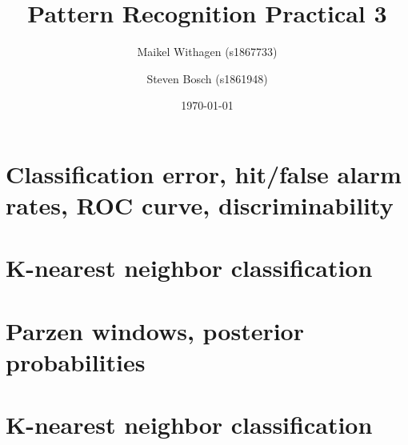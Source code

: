 \documentclass[10pt]{article}
\title{Pattern Recognition Practical 3}
\author{Maikel Withagen (s1867733) \and Steven Bosch (s1861948)}
\date{\today}
\begin{document}
\maketitle

\section{Classification error, hit/false alarm rates, ROC curve, discriminability}
\subsection{}


\section{K-nearest neighbor classification}
\section{Parzen windows, posterior probabilities}
\section{K-nearest neighbor classification}
\subsection{}
\end{document}
